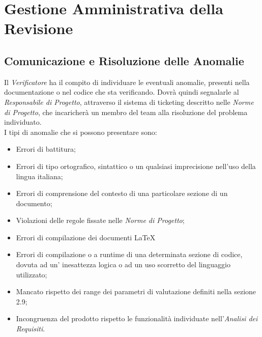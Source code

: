 \newpage
\section{Gestione Amministrativa della Revisione}

\subsection{Comunicazione e Risoluzione delle Anomalie}
Il \textit{Verificatore} ha il compito di individuare le eventuali anomalie, presenti nella documentazione o nel codice che sta verificando. Dovrà quindi segnalarle al \textit{Responsabile di Progetto}, attraverso il sistema di ticketing descritto nelle \textit{Norme di Progetto}, che incaricherà un membro del team alla risoluzione del problema individuato.\\ I tipi di anomalie che si possono presentare sono:
\begin{itemize} 
\item Errori di battitura;
\item Errori di tipo ortografico, sintattico o un qualsiasi imprecisione nell'uso della lingua italiana; 
\item Errori di comprensione del contesto di una particolare sezione di un documento;
\item Violazioni delle regole fissate nelle \textit{Norme di Progetto};
\item Errori di compilazione dei documenti \LaTeX~
\item Errori di compilazione o a runtime di una determinata sezione di codice, dovuta ad un' inesattezza logica o ad un uso scorretto del linguaggio utilizzato; 
\item Mancato rispetto dei range dei parametri di valutazione definiti nella sezione 2.9;
\item Incongruenza del prodotto rispetto le funzionalità individuate nell’\textit{Analisi dei Requisiti}.
\end{itemize}
